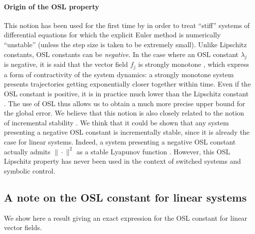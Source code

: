  
\paragraph{Origin of the OSL property}

This notion has been used for the first time by \cite{donchev1998stability}
in order to treat ``stiff'' systems of differential equations for which the explicit Euler method is
numerically ``unstable'' (unless the step size is taken to be extremely small).
Unlike Lipschitz constants, OSL constants can be {\em negative}.
In the case where an OSL constant $\lambda_j$ is negative, it is said that the vector 
field $f_j$ is strongly monotone \cite{???},
which express a form of contractivity of the system dynamics: a strongly monotone system
presents trajectories getting exponentially closer together 
within time.
Even if the OSL constant is positive, it is in practice much lower than
the Lipschitz constant \cite{dahlquist1976error}. The use of OSL thus allows us to obtain a much
more precise upper bound for the global error.
We believe that this notion is also closely related to
the notion of incremental stability \cite{???}. We think that 
it could be shown that any system presenting a negative OSL constant is
incrementally stable, since it is already the case for linear systems.
Indeed, a system presenting a negative OSL constant actually admits $\| \cdot \|^2$ 
as a stable Lyapunov function \cite{???}.
However, this OSL Lipschitz property has never been used in the context of
switched systems and symbolic control. 



\subsection{A note on the OSL constant for linear systems}

We show here a result giving an exact expression for the OSL constant
for linear vector fields.



